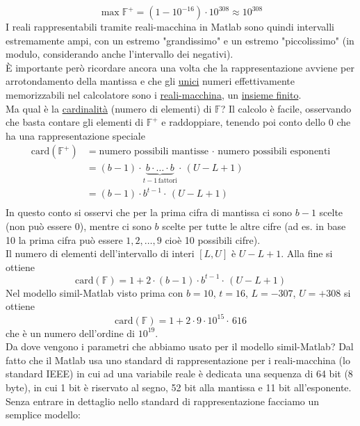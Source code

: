 \documentclass[12pt]{article}
\begin{document}
\[ \max \mathbb{F}^+ = (1 - 10^{-16})\cdot 10^{308} \approx 10^{308}\]
\newline \newline
I reali rappresentabili tramite reali-macchina in Matlab sono quindi intervalli estremamente ampi, con un estremo "grandissimo" e un estremo "piccolissimo" (in modulo, considerando anche l'intervallo dei negativi). \\
È importante però ricordare ancora una volta che la rappresentazione avviene per arrotondamento della mantissa e che gli \underline{unici} numeri effettivamente memorizzabili nel calcolatore sono i \underline{reali-macchina}, un \underline{insieme finito}.\\
Ma qual è la \underline{cardinalità} (numero di elementi) di $\mathbb{F}$? Il calcolo è facile, osservando che basta contare gli elementi di $\mathbb{F}^+$ e raddoppiare, tenendo poi conto dello 0 che ha una rappresentazione speciale
\[\begin{split}
    \text{card}(\mathbb{F}^+) & = \text{numero possibili mantisse} \,\cdot\, \text{numero possibili esponenti} \\
    & = (b-1)\cdot \underbrace{b \cdot \dotsc \cdot b}_{t - 1 \,\text{fattori}} \cdot \, (U - L + 1) \\
    & = (b-1)\cdot b^{t - 1} \cdot \, (U - L + 1) \\
\end{split}\]
In questo conto si osservi che per la prima cifra di mantissa ci sono $b - 1$ scelte (non può essere 0), mentre ci sono $b$ scelte per tutte le altre cifre (ad es. in base 10 la prima cifra può essere $1, 2, \dotsc , 9$ cioè 10 possibili cifre). \\
Il numero di elementi dell'intervallo di interi $[L,U]$ è $U-L+1$. Alla fine si ottiene
\[ \text{card}(\mathbb{F}) = 1 + 2 \cdot (b-1)\cdot b^{t - 1} \cdot \, (U - L + 1) \]
Nel modello simil-Matlab visto prima con $b = 10$, $t = 16$, $L = -307$, $U = +308$ si ottiene \[ \text{card}(\mathbb{F}) = 1 + 2 \cdot 9\cdot 10^{15} \cdot \, 616 \]
che è un numero dell'ordine di $10^{19}$.\\
Da dove vengono i parametri che abbiamo usato per il modello simil-Matlab? Dal fatto che il Matlab usa uno standard di rappresentazione per i reali-macchina (lo standard IEEE) in cui ad una variabile reale è dedicata una sequenza di 64 bit (8 byte), in cui 1 bit è riservato al segno, 52 bit alla mantissa e 11 bit all'esponente. \\
Senza entrare in dettaglio nello standard di rappresentazione facciamo un semplice modello:\newline
\end{document}
